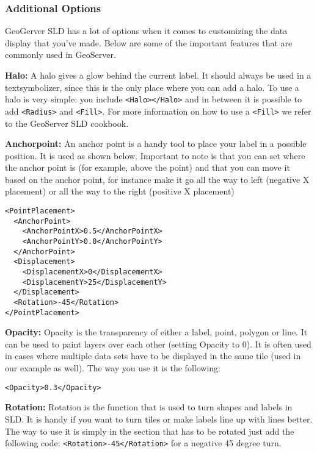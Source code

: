 \subsubsection{Additional Options}

GeoGerver SLD has a lot of options when it comes to customizing the data
display that you've made. Below are some of the important features that are
commonly used in GeoServer.

\textbf{Halo:} A halo gives a glow behind the current label. It should
always be used in a textsymbolizer, since this is the only place where you
can add a halo. To use a halo is very simple: you include
\lstinline|<Halo></Halo>| and in between it is possible to add
\lstinline|<Radius>| and \lstinline|<Fill>|. For more information on how to
use a \lstinline|<Fill>| we refer to the GeoServer SLD cookbook.

\textbf{Anchorpoint:} An anchor point is a handy tool to place your label
in a possible position. It is used as shown below. Important to note is
that you can set where the anchor point is (for example, above the point)
and that you can move it based on the anchor point, for instance make it go
all the way to left (negative X placement) or all the way to the right
(positive X placement)
\begin{lstlisting}
<PointPlacement>
  <AnchorPoint>
    <AnchorPointX>0.5</AnchorPointX>
    <AnchorPointY>0.0</AnchorPointY>
  </AnchorPoint>
  <Displacement>
    <DisplacementX>0</DisplacementX>
    <DisplacementY>25</DisplacementY>
  </Displacement>
  <Rotation>-45</Rotation>
</PointPlacement>
\end{lstlisting}

\textbf{Opacity:} Opacity is the transparency of either a label, point,
polygon or line. It can be used to paint layers over each other (setting
Opacity to 0). It is often used in cases where multiple data sets have to be
displayed in the same tile (used in our example as well). The way you use
it is the following:
\begin{lstlisting}
<Opacity>0.3</Opacity>
\end{lstlisting}

\textbf{Rotation:} Rotation is the function that is used to turn shapes and
labels in SLD. It is handy if you want to turn tiles or make labels line up
with lines better. The way to use it is simply in the section that has to
be rotated just add the following code:
\lstinline|<Rotation>-45</Rotation>| for a negative 45 degree turn.

